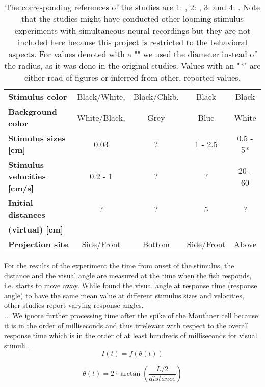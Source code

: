 \documentclass[a4paper,10pt,hidelinks]{scrreprt}
\begin{document}
\begin{table} [!th]
\begin{center}
\begin{tabular}{l|c|c|c|c}
				\textbf{Stimulus color} & Black/White, & Black/Chkb. & Black & Black\\
				\textbf{Background color} & White/Black, & Grey & Blue & White\\
				\textbf{Stimulus sizes [cm]} & 0.03 & ? & 1 - 2.5 & 0.5 - 5*\\
				\textbf{Stimulus velocities [cm/s]} & 0.2 - 1 & ? & ? & 20 - 60\\
				\textbf{Initial distances} & ? & ? & 5 & ?\\
				\textbf{(virtual) [cm]} &  &  &  & \\
				\textbf{Projection site} & Side/Front & Bottom & Side/Front & Above\\
			\end{tabular}
		\end{center}
		\caption{The corresponding references of the studies are 1: \cite{Temizer2015}, 
		2: \cite{Dunn2016}, 3: \cite{Bhattacharyya2017} and 4: \cite{Preuss2006}.
		Note that the studies might have conducted other looming stimulus experiments with 
		simultaneous neural recordings but they are not included here because this project is 
		restricted to the behavioral aspects.
		For values denoted with a "\dag" we used the diameter 
		instead of the radius, as it was done in the original studies.
		Values with an "*" are either 
		read of figures or inferred from other, reported values. }
		\label{tab:looming_exp}
	\end{table}
	For the results of the experiment the time from onset of the stimulus, the distance and the 
	visual angle are measured at the time when the fish responds, i.e. starts to move away.
	While \cite{Bhattacharyya2017} found the visual angle at response time (response angle) to 
	have the same mean value at different stimulus sizes and velocities, other studies report 
	varying 
	response angles.\\
	...
	We ignore further processing time after the spike of the Mauthner cell 
	because it is in the order of milliseconds \citep{Preuss2003} and thus 
	irrelevant with respect to the overall response time which is in the order 
	of at least hundreds of milliseconds for visual stimuli \citep{Preuss2006}.
	\begin{equation}
	I(t) = f(\theta (t))
	\label{eq:input}
	\end{equation}
	
	\begin{equation}
	\theta (t) = 2\cdot \arctan(\frac{L/2}{distance})
	\label{eq:theta}
	\end{equation}
	
\end{document}

